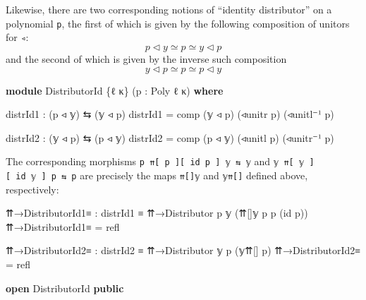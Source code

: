 \documentclass[
  11pt,
  oneside,
  article]{memoir}
\newenvironment{Shaded}{}{}
\newcommand{\KeywordTok}[1]{\textcolor[rgb]{0.00,0.44,0.13}{\textbf{#1}}}
\newcommand{\NormalTok}[1]{#1}
\newcommand{\OtherTok}[1]{\textcolor[rgb]{0.00,0.44,0.13}{#1}}
\theoremstyle{definition}
\theoremstyle{plain}
\newcommand{\0}{\textsf{0}}
\newcommand{\1}{\tn{\textsf{1}}}
\begin{document}
Likewise, there are two corresponding notions of ``identity
distributor'' on a polynomial \texttt{p}, the first of which is given by
the following composition of unitors for \texttt{◃}: \[
p \triangleleft y \simeq p \simeq y \triangleleft p
\] and the second of which is given by the inverse such composition \[
y \triangleleft p \simeq p \simeq p \triangleleft y
\]

\begin{Shaded}
\begin{Highlighting}[]
\KeywordTok{module}\NormalTok{ DistributorId }\OtherTok{\{}\NormalTok{ℓ κ}\OtherTok{\}} \OtherTok{(}\NormalTok{p }\OtherTok{:}\NormalTok{ Poly ℓ κ}\OtherTok{)} \KeywordTok{where}

\NormalTok{    distrId1 }\OtherTok{:} \OtherTok{(}\NormalTok{p ◃ 𝕪}\OtherTok{)}\NormalTok{ ⇆ }\OtherTok{(}\NormalTok{𝕪 ◃ p}\OtherTok{)}
\NormalTok{    distrId1 }\OtherTok{=}\NormalTok{ comp }\OtherTok{(}\NormalTok{𝕪 ◃ p}\OtherTok{)} \OtherTok{(}\NormalTok{◃unitr p}\OtherTok{)} \OtherTok{(}\NormalTok{◃unitl⁻¹ p}\OtherTok{)}

\NormalTok{    distrId2 }\OtherTok{:} \OtherTok{(}\NormalTok{𝕪 ◃ p}\OtherTok{)}\NormalTok{ ⇆ }\OtherTok{(}\NormalTok{p ◃ 𝕪}\OtherTok{)}
\NormalTok{    distrId2 }\OtherTok{=}\NormalTok{ comp }\OtherTok{(}\NormalTok{p ◃ 𝕪}\OtherTok{)} \OtherTok{(}\NormalTok{◃unitl p}\OtherTok{)} \OtherTok{(}\NormalTok{◃unitr⁻¹ p}\OtherTok{)}
\end{Highlighting}
\end{Shaded}

The corresponding morphisms
\texttt{p\ ⇈{[}\ p\ {]}{[}\ id\ p\ {]}\ 𝕪\ ⇆\ 𝕪} and
\texttt{𝕪\ ⇈{[}\ 𝕪\ {]}{[}\ id\ 𝕪\ {]}\ p\ ⇆\ p} are precisely the maps
\texttt{⇈{[}{]}𝕪} and \texttt{𝕪⇈{[}{]}} defined above, respectively:

\begin{Shaded}
\begin{Highlighting}[]
\NormalTok{    ⇈→DistributorId1≡ }\OtherTok{:}\NormalTok{ distrId1 ≡ ⇈→Distributor p 𝕪 }\OtherTok{(}\NormalTok{⇈[]𝕪 p p }\OtherTok{(}\NormalTok{id p}\OtherTok{))}
\NormalTok{    ⇈→DistributorId1≡ }\OtherTok{=}\NormalTok{ refl}

\NormalTok{    ⇈→DistributorId2≡ }\OtherTok{:}\NormalTok{ distrId2 ≡ ⇈→Distributor 𝕪 p }\OtherTok{(}\NormalTok{𝕪⇈[] p}\OtherTok{)}
\NormalTok{    ⇈→DistributorId2≡ }\OtherTok{=}\NormalTok{ refl}

\KeywordTok{open}\NormalTok{ DistributorId }\KeywordTok{public}
\end{Highlighting}
\end{Shaded}
\end{document}
